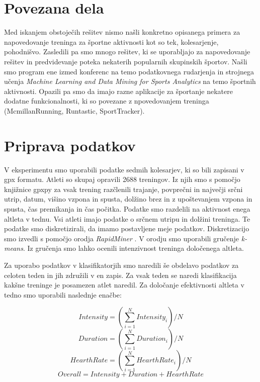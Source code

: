 \documentclass{acm_proc_article-sp}
\begin{document}
\section{Povezana dela}
Med iskanjem obstoječih rešitev nismo našli konkretno opisanega primera 
za napovedovanje treninga za športne aktivnosti kot so tek, kolesarjenje,
pohodnišvo. Zasledili pa smo mnogo rešitev, ki se uporabljajo za napovedovanje
rešitev in predvidevanje poteka nekaterih popularnih skupinskih športov.
Našli smo program ene izmed konferenc na temo podatkovnega rudarjenja in 
strojnega učenja \textit{Machine Learning and Data Mining for Sports Analytics} \cite{mladmfsport} na temo športnih aktivnosti.
Opazili pa smo da imajo razne aplikacije za športanje nekatere dodatne funkcionalnosti,
ki so povezane z npovedovanjem treninga (McmillanRunning, Runtastic, SportTracker).


\section{Priprava podatkov}
V eksperimentu smo uporabili podatke sedmih kolesarjev, ki so bili zapisani v gpx formatu. Atleti so skupaj opravili 2688 treningov. Iz njih smo s pomočjo knjižnice gpxpy za vsak trening razčlenili trajanje, povprečni in največji srčni utrip, datum, višino vzpona in spusta, dolžino brez in z upoštevanjem vzpona in spusta, čas premikanja in čas počitka. 
Podatke smo razdelili na aktivnost enega altleta v tednu.
Vsi atleti imajo podatke o srčnem utripu in dolžini treninga.
Te podatke smo diskretizirali, da imamo postavljene meje podatkov.
Diskretizacijo smo izvedli s pomočjo orodja \textit{RapidMiner} \cite{rapidminer}.
V orodju smo uporabili gručenje \textit{k-means}. Iz gručenja smo lahko ocenili intenzivnost treninga določenega altleta.

Za uporabo podatkov v klasifikatorjih smo naredili še obdelavo podatkov za celoten teden in jih združili v en zapis.
Za vsak teden se naredi klasifikacija kakšne treninge je posamezen atlet naredil.
Za določanje efektivnosti altleta v tedno smo uporabili naslednje enačbe: 

\begin{equation}
Intensity = (\sum_{i=1}^{N} Intensity_i) / N
\end{equation}
\begin{equation}
Duration = (\sum_{i=1}^{N} Duration_i) / N
\end{equation}
\begin{equation}
HearthRate = (\sum_{i=1}^{N} HearthRate_i) / N
\end{equation}
\begin{equation} \label{eq:overall}
Overall = Intensity + Duration + HearthRate
\end{equation}
\end{document}
